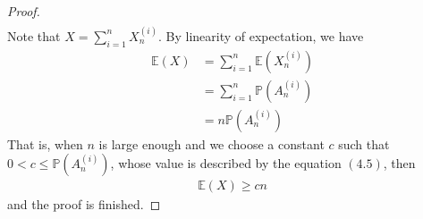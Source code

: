 \begin{proof}
\begin{align*}
  \end{align*}
  Note that $X = \sum_{i = 1}^{n} X_{n}^{(i)}$. By linearity of expectation, we have
  \begin{align*}
    \mathbb{E}(X) &= \sum_{i = 1}^{n} \mathbb{E}(X_{n}^{(i)}) \\
                  &= \sum_{i = 1}^{n} \mathbb{P}(A_{n}^{(i)}) \\
                  &= n \mathbb{P}(A_{n}^{(i)})
  \end{align*}
  That is, when $n$ is large enough and we choose a constant $c$ such that $0 < c \leq \mathbb{P}(A_{n}^{(i)})$, whose value is described by the equation $(4.5)$, then
  \begin{align*}
    \mathbb{E}(X) \geq cn
  \end{align*}
  and the proof is finished.
\end{proof}
